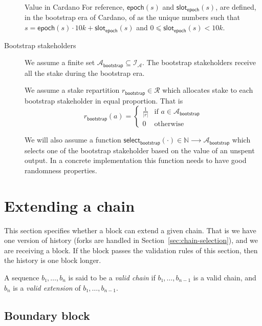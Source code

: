 \documentclass{article}
\newenvironment{currentvalue}{\begin{bclogo}[noborder=true,
    logo=\bcinfo, epBarre=3, couleurBarre=YellowOrange]{Value in Cardano}}{\end{bclogo}}
\newcommand{\supportsize}[1]{|#1|}
\newcommand{\idsof}[1]{\mathcal{I}\!_#1}
\newcommand{\agentids}{\idsof{\mathcal{A}}}
\newcommand{\bootstrapstakeholders}{\mathcal{A}_{\mathsf{bootstrap}}}
\newcommand{\epoch}[1]{\mathsf{epoch}(#1)}
\newcommand{\epochslot}[1]{\mathsf{slot}_\mathsf{epoch}(#1)}
\newcommand{\selectrichman}[1]{\mathsf{select}_\mathsf{bootstrap}(#1)}
\newcommand{\stakerepartitions}{\mathcal{R}}
\newcommand{\bootstraprepartition}{r_\mathsf{bootstrap}}
\begin{document}
\begin{description}
  \begin{currentvalue}
    For reference, $\epoch{s}$ and $\epochslot{s}$, are defined, in
    the bootstrap era of Cardano, of as the unique numbers such that
    $s=\epoch{s}\cdot 10k+\epochslot{s}$ and $0⩽ \epochslot{s} < 10k$.
  \end{currentvalue}


\item[Bootstrap stakeholders] We assume a finite set
  $\bootstrapstakeholders ⊆ \agentids$. The bootstrap stakeholders receive all the
  stake during the bootstrap era.

  We assume a stake repartition
  $\bootstraprepartition ∈ \stakerepartitions$ which allocates stake
  to each bootstrap stakeholder in equal proportion. That is
  $$
  \bootstraprepartition(a) = \left\{
    \begin{array}{cl}
      \displaystyle{\frac{1}{\supportsize{r}}}& \mbox{if $a∈\bootstrapstakeholders$}\\
      0 & \mbox{otherwise}
    \end{array}\right.
  $$

  We will also assume a function $\selectrichman{⋅} ∈ ℕ ⟶ \bootstrapstakeholders$
  which selects one of the bootstrap stakeholder based on the value of an unspent
  output. In a concrete implementation this function needs to have
  good randomness properties.

\end{description}
\section{Extending a chain}
\label{sec:adding-block}

This section specifies whether a block can extend a given chain. That
is we have one version of history (forks are handled in
Section~\ref{sec:chain-selection}), and we are receiving a block. If
the block passes the validation rules of this section, then the
history is one block longer.

A sequence $b₁,…,b_n$ is said to be a \emph{valid chain} if
$b₁,…,b_{n-1}$ is a valid chain,
and $b_n$ is a \emph{valid extension} of $b₁,…,b_{n-1}$.

\subsection{Boundary block}
\label{sec:boundary-block}
\end{document}
